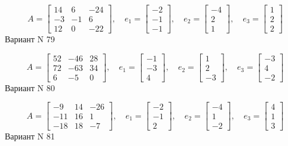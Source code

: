 \documentclass[11pt]{report}
\begin{document}
$$A = \left[\begin{matrix}14 & 6 & -24\\-3 & -1 & 6\\12 & 0 & -22\end{matrix}\right],\quad e_1 = \left[\begin{matrix}-2\\-1\\-1\end{matrix}\right],\quad e_2 = \left[\begin{matrix}-4\\2\\1\end{matrix}\right],\quad e_3 = \left[\begin{matrix}1\\2\\2\end{matrix}\right]$$Вариант N 79

$$A = \left[\begin{matrix}52 & -46 & 28\\72 & -63 & 34\\6 & -5 & 0\end{matrix}\right],\quad e_1 = \left[\begin{matrix}-1\\-3\\4\end{matrix}\right],\quad e_2 = \left[\begin{matrix}1\\2\\-3\end{matrix}\right],\quad e_3 = \left[\begin{matrix}-3\\4\\-2\end{matrix}\right]$$Вариант N 80

$$A = \left[\begin{matrix}-9 & 14 & -26\\-11 & 16 & 1\\-18 & 18 & -7\end{matrix}\right],\quad e_1 = \left[\begin{matrix}-2\\-1\\2\end{matrix}\right],\quad e_2 = \left[\begin{matrix}-4\\1\\-2\end{matrix}\right],\quad e_3 = \left[\begin{matrix}4\\1\\3\end{matrix}\right]$$Вариант N 81
\end{document}
